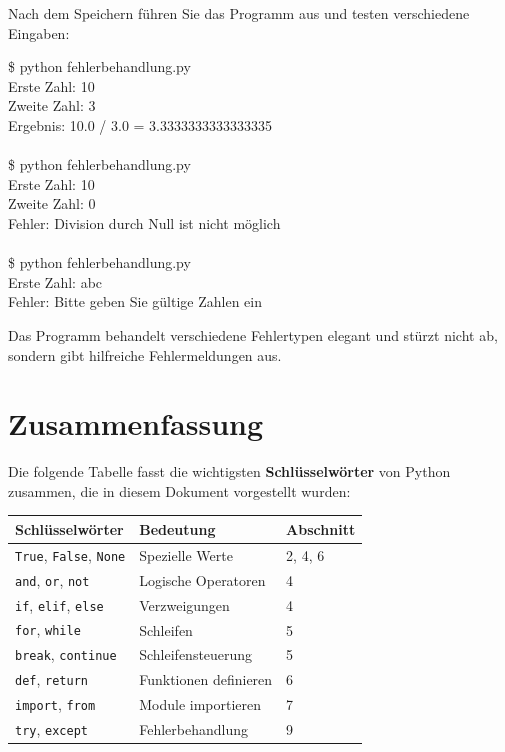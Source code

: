 \documentclass[ngerman,11pt]{article}
\begin{document}
\noindent Nach dem Speichern führen Sie das Programm aus und testen verschiedene Eingaben:

\begin{tcolorbox}[colback=gray!15, fontupper=\ttfamily, boxrule=0.5pt,
    left=3mm, right=3mm, top=2mm, bottom=2mm]
\$ python fehlerbehandlung.py\\
Erste Zahl: 10\\
Zweite Zahl: 3\\
Ergebnis: 10.0 / 3.0 = 3.3333333333333335\\
\\
\$ python fehlerbehandlung.py\\
Erste Zahl: 10\\
Zweite Zahl: 0\\
Fehler: Division durch Null ist nicht möglich\\
\\
\$ python fehlerbehandlung.py\\
Erste Zahl: abc\\
Fehler: Bitte geben Sie gültige Zahlen ein
\end{tcolorbox}

\noindent Das Programm behandelt verschiedene Fehlertypen elegant und stürzt nicht ab, sondern gibt hilfreiche Fehlermeldungen aus.


\section{Zusammenfassung}

Die folgende Tabelle fasst die wichtigsten \textbf{Schlüsselwörter} von Python zusammen, die in diesem Dokument vorgestellt wurden:

\begin{center}
\begin{tabular}{|l|l|l|}
\hline
\textbf{Schlüsselwörter} & \textbf{Bedeutung} & \textbf{Abschnitt} \\
\hline
\texttt{True}, \texttt{False}, \texttt{None} & Spezielle Werte & 2, 4, 6\\
\texttt{and}, \texttt{or}, \texttt{not} & Logische Operatoren & 4 \\
\texttt{if}, \texttt{elif}, \texttt{else} & Verzweigungen & 4 \\
\texttt{for}, \texttt{while} & Schleifen & 5 \\
\texttt{break}, \texttt{continue} & Schleifensteuerung & 5 \\
\texttt{def}, \texttt{return} & Funktionen definieren & 6 \\
\texttt{import}, \texttt{from} & Module importieren & 7 \\
\texttt{try}, \texttt{except} & Fehlerbehandlung & 9 \\
\hline
\end{tabular}
\end{center}
\end{document}
